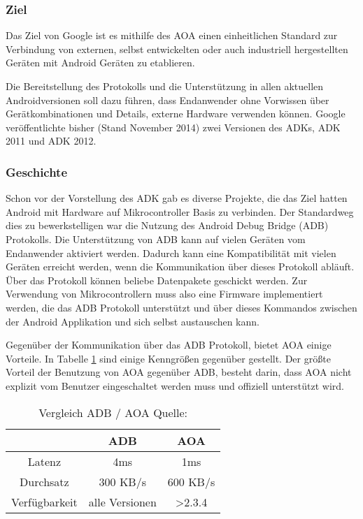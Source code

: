 \documentclass[12pt,journal,compsoc]{IEEEtran}
\begin{document}
\subsubsection{Ziel}
Das Ziel von Google ist es mithilfe des AOA einen einheitlichen Standard zur Verbindung von externen, selbst entwickelten oder auch industriell hergestellten Geräten mit Android Geräten zu etablieren.

Die Bereitstellung des Protokolls und die Unterstützung in allen aktuellen Androidversionen soll dazu führen, dass Endanwender ohne Vorwissen über Gerätkombinationen und Details, externe Hardware verwenden können.
Google veröffentlichte bisher (Stand November 2014) zwei Versionen des ADKs, ADK 2011 und ADK 2012. 

\subsubsection{Geschichte}
Schon vor der Vorstellung des ADK gab es diverse Projekte, die das Ziel hatten Android mit Hardware auf Mikrocontroller Basis zu verbinden.
Der Standardweg dies zu bewerkstelligen war die Nutzung des Android Debug Bridge (ADB) Protokolls.
Die Unterstützung von ADB kann auf vielen Geräten vom Endanwender aktiviert werden. Dadurch kann eine Kompatibilität mit vielen Geräten erreicht werden, wenn die Kommunikation über dieses Protokoll abläuft. 
Über das Protokoll können beliebe Datenpakete geschickt werden. Zur Verwendung von Mikrocontrollern muss also eine Firmware implementiert werden, die das ADB Protokoll unterstützt und über dieses Kommandos zwischen der Android Applikation und sich selbst austauschen kann.

Gegenüber der Kommunikation über das ADB Protokoll, bietet AOA einige Vorteile. In Tabelle  \ref{table:vergl} sind einige Kenngrößen gegenüber gestellt. Der größte Vorteil der Benutzung von AOA gegenüber ADB, besteht darin, dass AOA nicht explizit vom Benutzer eingeschaltet werden muss und offiziell unterstützt wird.


\begin{table}
	\centering
	\caption{Vergleich ADB / AOA Quelle: \cite{comp}}
	\label{table:vergl}
	\begin{tabular}{c | c | c}
		& ADB & AOA \\ \hline
		Latenz & 4ms & 1ms \\ \hline
		Durchsatz & 300 KB/s & 600 KB/s \\ \hline
		Verfügbarkeit & alle Versionen & \textgreater 2.3.4 \\ \hline
	\end{tabular}
\end{table}
\end{document}
